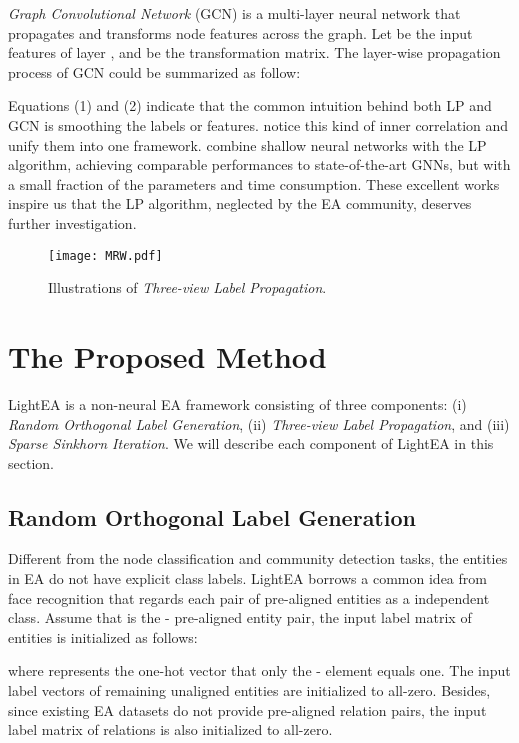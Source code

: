 \documentclass[11pt]{article}
\begin{document}
\emph{Graph Convolutional Network} (GCN) \cite{DBLP:journals/corr/KipfW16} is a multi-layer neural network that propagates and transforms node features across the graph.
Let  be the input features of layer , and  be the transformation matrix.
The layer-wise propagation process of GCN could be summarized as follow:


Equations (1) and (2) indicate that the common intuition behind both LP and GCN is smoothing the labels or features.
\citet{DBLP:journals/corr/abs-2002-06755} notice this kind of inner correlation and unify them into one framework.
\citet{DBLP:conf/iclr/HuangHSLB21} combine shallow neural networks with the LP algorithm, achieving comparable performances to state-of-the-art GNNs, but with a small fraction of the parameters and time consumption.
These excellent works inspire us that the LP algorithm, neglected by the EA community, deserves further investigation.

\begin{figure*}
    \centering
    \texttt{[image: MRW.pdf]}
    \caption{Illustrations of \emph{Three-view Label Propagation}.}
    \label{fig:MRW}
\end{figure*}

\section{The Proposed Method}
LightEA is a non-neural EA framework consisting of three components: (i) \emph{Random Orthogonal Label Generation}, (ii) \emph{Three-view Label Propagation}, and (iii) \emph{Sparse Sinkhorn Iteration}.
We will describe each component of LightEA in this section.

\subsection{Random Orthogonal Label Generation}
Different from the node classification and community detection tasks, the entities in EA do not have explicit class labels.
LightEA borrows a common idea from face recognition \cite{DBLP:journals/spl/WangCLL18,DBLP:conf/cvpr/DengGXZ19} that regards each pair of pre-aligned entities as a independent class.
Assume that  is the - pre-aligned entity pair, the input label matrix of entities  is initialized as follows:

where  represents the one-hot vector that only the - element equals one.
The input label vectors of remaining unaligned entities are initialized to all-zero.
Besides, since existing EA datasets do not provide pre-aligned relation pairs, the input label matrix of relations  is also initialized to all-zero.
\end{document}
